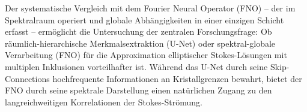 \documentclass[a4paper,12pt]{article}
\begin{document}
Der systematische Vergleich mit dem Fourier Neural Operator (FNO) -- der im Spektralraum operiert und globale Abhängigkeiten in einer einzigen Schicht erfasst -- ermöglicht die Untersuchung der zentralen Forschungsfrage: Ob räumlich-hierarchische Merkmalsextraktion (U-Net) oder spektral-globale Verarbeitung (FNO) für die Approximation elliptischer Stokes-Lösungen mit multiplen Inklusionen vorteilhafter ist. Während das U-Net durch seine Skip-Connections hochfrequente Informationen an Kristallgrenzen bewahrt, bietet der FNO durch seine spektrale Darstellung einen natürlichen Zugang zu den langreichweitigen Korrelationen der Stokes-Strömung.
\end{document}

